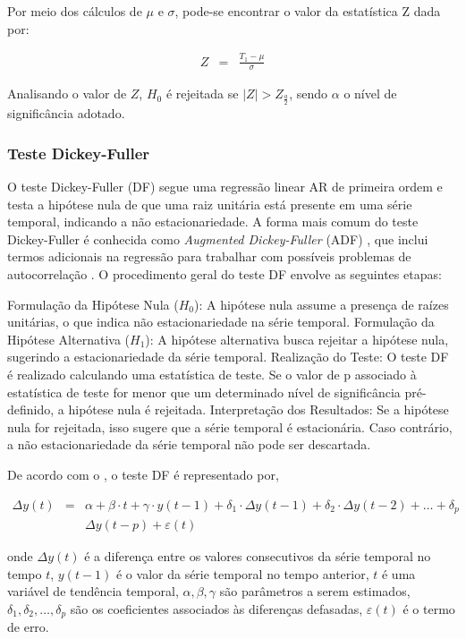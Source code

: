 Por meio dos cálculos de $\mu$ e $\sigma$, pode-se encontrar o valor da estatística $\mathrm{Z}$ dada por:

\begin{eqnarray}
	Z&=&\frac{T_1-\mu}{\sigma}
\end{eqnarray}


Analisando o valor de $Z$, $H_0$ é rejeitada se $|Z|>Z_{\frac{a}{2}}$, sendo $\alpha$ o nível de significância adotado.



\subsubsection{Teste Dickey-Fuller}

O teste Dickey-Fuller (DF) segue uma regressão linear AR de primeira ordem e testa a hipótese nula de que uma raiz unitária está presente em uma série temporal, indicando a não estacionariedade. A forma mais comum do teste Dickey-Fuller é conhecida como \textit{Augmented Dickey-Fuller} (ADF) , que inclui termos adicionais na regressão para trabalhar com possíveis problemas de autocorrelação
 \cite{Agiakloglou}. O procedimento geral do teste DF envolve as seguintes etapas:

Formulação da Hipótese Nula ($H_0$): A hipótese nula assume a presença de raízes unitárias, o que indica não estacionariedade na série temporal.
Formulação da Hipótese Alternativa ($H_1$): A hipótese alternativa busca rejeitar a hipótese nula, sugerindo a estacionariedade da série temporal.
Realização do Teste: O teste DF é realizado calculando uma estatística de teste. Se o valor de p associado à estatística de teste for menor que um determinado nível de significância pré-definido, a hipótese nula é rejeitada.
Interpretação dos Resultados: Se a hipótese nula for rejeitada, isso sugere que a série temporal é estacionária. Caso contrário, a não estacionariedade da série temporal não pode ser descartada.

De acordo com o , o teste DF é representado por,



\begin{eqnarray}
	 \Delta y(t)&=&\alpha+\beta \cdot t+\gamma \cdot y(t-1)+\delta_1 \cdot \Delta y(t-1)+\delta_2 \cdot \Delta y(t-2)+\ldots+\delta_p \nonumber\\ 
	&&\Delta y(t-p)+\varepsilon(t)
\end{eqnarray}

\noindent onde $\Delta y(t)$ é a diferença entre os valores consecutivos da série temporal no tempo $t$, $y(t-1)$ é o valor da série temporal no tempo anterior, $t$ é uma variável de tendência temporal, $\alpha, \beta, \gamma$ são parâmetros a serem estimados, $\delta_1, \delta_2, \ldots, \delta_p$ são os coeficientes associados às diferenças defasadas, $\varepsilon(t)$ é o termo de erro.
 
